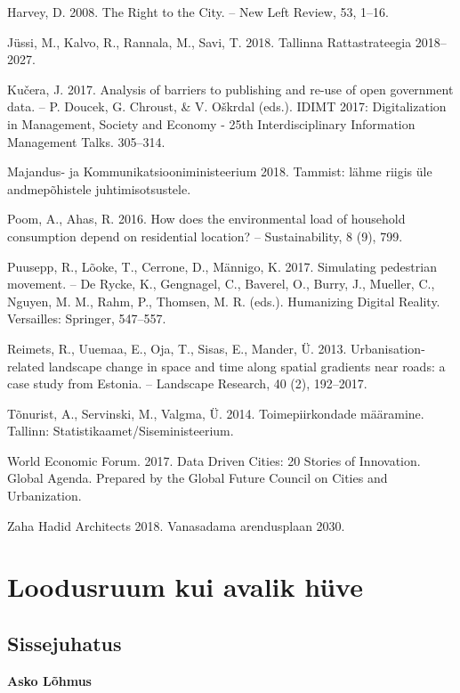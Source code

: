 \documentclass[estonian,]{article}
\begin{document}
Harvey, D. 2008. The Right to the City. -- New Left Review, 53, 1--16.

Jüssi, M., Kalvo, R., Rannala, M., Savi, T. 2018. Tallinna Rattastrateegia 2018--2027.

Kučera, J. 2017. Analysis of barriers to publishing and re-use of open government data. -- P. Doucek, G. Chroust, \& V. Oškrdal (eds.). IDIMT 2017: Digitalization in Management, Society and Economy - 25th Interdisciplinary Information Management Talks. 305--314.

Majandus- ja Kommunikatsiooniministeerium 2018. Tammist: lähme riigis üle andmepõhistele juhtimisotsustele.

Poom, A., Ahas, R. 2016. How does the environmental load of household consumption depend on residential location? -- Sustainability, 8 (9), 799.

Puusepp, R., Lõoke, T., Cerrone, D., Männigo, K. 2017. Simulating pedestrian movement. -- De Rycke, K., Gengnagel, C., Baverel, O., Burry, J., Mueller, C., Nguyen, M. M., Rahm, P., Thomsen, M. R. (eds.). Humanizing Digital Reality. Versailles: Springer, 547--557.

Reimets, R., Uuemaa, E., Oja, T., Sisas, E., Mander, Ü. 2013. Urbanisation-related landscape change in space and time along spatial gradients near roads: a case study from Estonia. -- Landscape Research, 40 (2), 192--2017.

Tõnurist, A., Servinski, M., Valgma, Ü. 2014. Toimepiirkondade määramine. Tallinn: Statistikaamet/Siseministeerium.

World Economic Forum. 2017. Data Driven Cities: 20 Stories of Innovation. Global Agenda. Prepared by the Global Future Council on Cities and Urbanization.

Zaha Hadid Architects 2018. Vanasadama arendusplaan 2030.

\hypertarget{loodusruum-kui-avalik-huxfcve}{%
\section{Loodusruum kui avalik hüve}\label{loodusruum-kui-avalik-huxfcve}}

\hypertarget{sissejuhatus-2}{%
\subsection*{Sissejuhatus}\label{sissejuhatus-2}}

\begin{authors}
\textbf{Asko Lõhmus}
\end{authors}
\end{document}
